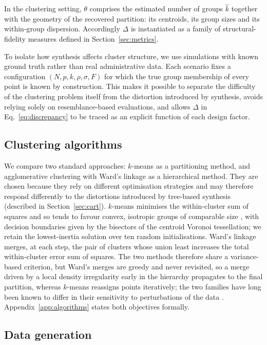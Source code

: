 \documentclass[pdflatex,sn-basic]{sn-jnl}
\begin{document}
In the clustering setting, $\theta$ comprises the estimated number of groups
$\hat{k}$ together with the geometry of the recovered partition: its
centroids, its group sizes and its within-group dispersion. Accordingly
$\Delta$ is instantiated as a family of structural-fidelity measures defined in
Section~\ref{sec:metrics}.

To isolate how synthesis affects cluster structure, we use simulations with
known ground truth rather than real administrative data. Each scenario fixes a
configuration $(N, p, k, \rho, \sigma, F)$ for which the true group membership
of every point is known by construction. This makes it possible to separate the
difficulty of the clustering problem itself from the distortion introduced by
synthesis, avoids relying solely on resemblance-based evaluations, and allows
$\Delta$ in Eq.~\eqref{eq:discrepancy} to be traced as an explicit function of
each design factor.

\subsection{Clustering algorithms}
\label{sec:algorithms}

We compare two standard approaches: $k$-means \citep{macqueen1967} as a
partitioning method, and agglomerative clustering with Ward's linkage
\citep{ward1963} as a hierarchical method. They are chosen because they rely on
different optimisation strategies and may therefore respond differently to the
distortions introduced by tree-based synthesis (described in
Section~\ref{sec:cart}). $k$-means minimises the within-cluster sum of squares
and so tends to favour convex, isotropic groups of comparable size
\citep{steinley2006,xiong2009}, with decision boundaries given by the bisectors
of the centroid Voronoi tessellation; we retain the lowest-inertia solution
over ten random initialisations. Ward's linkage merges, at each step, the pair
of clusters whose union least increases the total within-cluster error sum of
squares. The two methods therefore share a variance-based criterion, but Ward's
merges are greedy and never revisited, so a merge driven by a local density
irregularity early in the hierarchy propagates to the final partition, whereas
$k$-means reassigns points iteratively; the two families have long been known
to differ in their sensitivity to perturbations of the data
\citep{milligan1980}. Appendix~\ref{app:algorithms} states both objectives
formally.

\subsection{Data generation}
\end{document}
